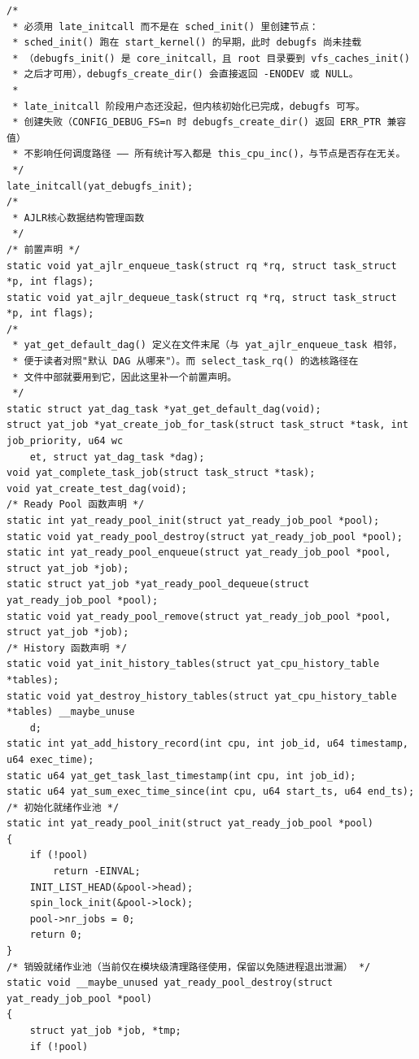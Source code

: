 \documentclass[10pt,a4paper]{article}
\newenvironment{yatpage}{\vspace*{0pt}}{\par}
\begin{document}
\begin{yatpage}
\begin{Verbatim}[fontsize=\fontsize{8.2}{9.8}\selectfont]
/*
 * 必须用 late_initcall 而不是在 sched_init() 里创建节点：
 * sched_init() 跑在 start_kernel() 的早期，此时 debugfs 尚未挂载
 * （debugfs_init() 是 core_initcall，且 root 目录要到 vfs_caches_init()
 * 之后才可用），debugfs_create_dir() 会直接返回 -ENODEV 或 NULL。
 *
 * late_initcall 阶段用户态还没起，但内核初始化已完成，debugfs 可写。
 * 创建失败（CONFIG_DEBUG_FS=n 时 debugfs_create_dir() 返回 ERR_PTR 兼容值）
 * 不影响任何调度路径 —— 所有统计写入都是 this_cpu_inc()，与节点是否存在无关。
 */
late_initcall(yat_debugfs_init);
/*
 * AJLR核心数据结构管理函数
 */
/* 前置声明 */
static void yat_ajlr_enqueue_task(struct rq *rq, struct task_struct *p, int flags);
static void yat_ajlr_dequeue_task(struct rq *rq, struct task_struct *p, int flags);
/*
 * yat_get_default_dag() 定义在文件末尾（与 yat_ajlr_enqueue_task 相邻，
 * 便于读者对照"默认 DAG 从哪来"）。而 select_task_rq() 的选核路径在
 * 文件中部就要用到它，因此这里补一个前置声明。
 */
static struct yat_dag_task *yat_get_default_dag(void);
struct yat_job *yat_create_job_for_task(struct task_struct *task, int job_priority, u64 wc
    et, struct yat_dag_task *dag);
void yat_complete_task_job(struct task_struct *task);
void yat_create_test_dag(void);
/* Ready Pool 函数声明 */
static int yat_ready_pool_init(struct yat_ready_job_pool *pool);
static void yat_ready_pool_destroy(struct yat_ready_job_pool *pool);
static int yat_ready_pool_enqueue(struct yat_ready_job_pool *pool, struct yat_job *job);
static struct yat_job *yat_ready_pool_dequeue(struct yat_ready_job_pool *pool);
static void yat_ready_pool_remove(struct yat_ready_job_pool *pool, struct yat_job *job);
/* History 函数声明 */
static void yat_init_history_tables(struct yat_cpu_history_table *tables);
static void yat_destroy_history_tables(struct yat_cpu_history_table *tables) __maybe_unuse
    d;
static int yat_add_history_record(int cpu, int job_id, u64 timestamp, u64 exec_time);
static u64 yat_get_task_last_timestamp(int cpu, int job_id);
static u64 yat_sum_exec_time_since(int cpu, u64 start_ts, u64 end_ts);
/* 初始化就绪作业池 */
static int yat_ready_pool_init(struct yat_ready_job_pool *pool)
{
    if (!pool)
        return -EINVAL;
    INIT_LIST_HEAD(&pool->head);
    spin_lock_init(&pool->lock);
    pool->nr_jobs = 0;
    return 0;
}
/* 销毁就绪作业池（当前仅在模块级清理路径使用，保留以免随进程退出泄漏） */
static void __maybe_unused yat_ready_pool_destroy(struct yat_ready_job_pool *pool)
{
    struct yat_job *job, *tmp;
    if (!pool)
\end{Verbatim}
\end{yatpage}
\end{document}
